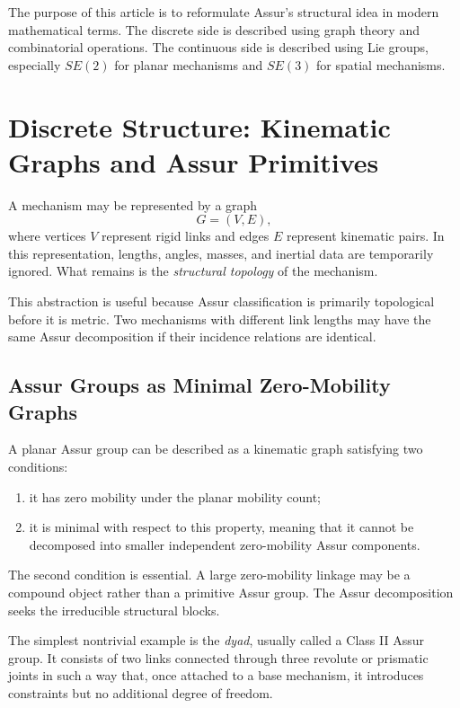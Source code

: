 The purpose of this article is to reformulate Assur's structural idea in modern mathematical terms. The discrete side is described using graph theory and combinatorial operations. The continuous side is described using Lie groups, especially $SE(2)$ for planar mechanisms and $SE(3)$ for spatial mechanisms.

\section{Discrete Structure: Kinematic Graphs and Assur Primitives}

A mechanism may be represented by a graph
\[
G = (V,E),
\]
where vertices $V$ represent rigid links and edges $E$ represent kinematic pairs. In this representation, lengths, angles, masses, and inertial data are temporarily ignored. What remains is the \emph{structural topology} of the mechanism.

This abstraction is useful because Assur classification is primarily topological before it is metric. Two mechanisms with different link lengths may have the same Assur decomposition if their incidence relations are identical.

\subsection{Assur Groups as Minimal Zero-Mobility Graphs}

A planar Assur group can be described as a kinematic graph satisfying two conditions:

\begin{enumerate}[label=(\roman*)]
\item it has zero mobility under the planar mobility count;
\item it is minimal with respect to this property, meaning that it cannot be decomposed into smaller independent zero-mobility Assur components.
\end{enumerate}

The second condition is essential. A large zero-mobility linkage may be a compound object rather than a primitive Assur group. The Assur decomposition seeks the irreducible structural blocks.

The simplest nontrivial example is the \emph{dyad}, usually called a Class II Assur group. It consists of two links connected through three revolute or prismatic joints in such a way that, once attached to a base mechanism, it introduces constraints but no additional degree of freedom.

